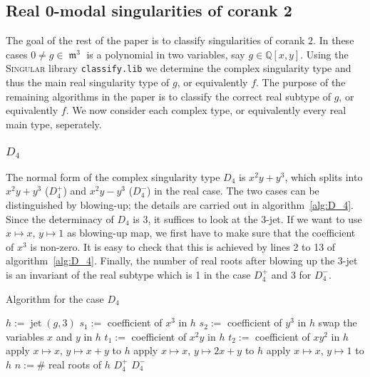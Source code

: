 \documentclass[noend]{amsproc}
\DeclareMathOperator{\m}{\mathfrak{m}}
\DeclareMathOperator{\jt}{jet}
\begin{document}
\subsection{Real $\mathbf 0$-modal singularities of corank $\mathbf 2$}
The goal of the rest of the paper is to classify singularities of corank $2$.
In these cases $0\neq g\in\m^3$ is a polynomial in two variables, say
$g\in\mathbb Q[x,y]$. Using the \textsc{Singular} library {\tt classify.lib} we
determine the complex singularity type and thus the main real singularity type
of $g$, or equivalently $f$. The purpose of the remaining algorithms in the
paper is to classify the correct real subtype of $g$, or equivalently $f$. We
now consider each complex type, or equivalently every real main type,
seperately.

\subsubsection{$D_4$}

The normal form of the complex singularity type $D_4$ is $x^2y+y^3$, which
splits into $x^2y+y^3$ ($D_4^+$) and $x^2y-y^3$ ($D_4^-$) in the real case.
The two cases can be distinguished by blowing-up; the details are carried out
in algorithm~\ref{alg:D_4}. Since the determinacy of
$D_4$ is $3$, it suffices to look at the $3$-jet. If we want to use
$x \mapsto x$, $y \mapsto 1$ as blowing-up map, we first have to make sure that
the coefficient of $x^3$ is non-zero. It is easy to check that this is achieved
by lines 2 to 13 of algorithm~\ref{alg:D_4}. Finally, the number of real roots
after blowing up the 3-jet is an invariant of the real subtype which is 1 in
the case $D_4^+$ and 3 for $D_4^-$.

\begin{algorithm}[h]
\caption{\label{alg:D_4}\label{D[4]} Algorithm for the case $D_4$}
\begin{algorithmic}[1]

\REQUIRE{$g\in \m^3\subset\mathbb Q[x,y]$ of complex singularity type $D_4$}
\STATE $h := \jt(g,3)$
\STATE $s_1:=$ coefficient of ${x^3}$ in $h$
\STATE $s_2 :=$ coefficient of ${y^3}$ in $h$
\STATE swap the variables $x$ and $y$ in $h$
\ELSE
\STATE $t_1:=$ coefficient of ${x^2y}$ in $h$
\STATE $t_2:=$ coefficient of ${xy^2}$ in $h$
\STATE apply $x\mapsto x$, $y\mapsto x+y$ to $h$
\ELSE
\STATE apply $x\mapsto x$, $y\mapsto 2x+y$ to $h$
\ENDIF
\ENDIF
\ENDIF
\STATE apply $x\mapsto x$, $y\mapsto 1$ to $h$
\STATE $n:= \#$ real roots of $h$
\RETURN $D_4^+$
\ELSE
\RETURN $D_4^-$
\ENDIF

\end{algorithmic}
\end{algorithm}
\end{document}
